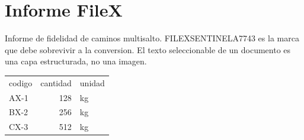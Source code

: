 \documentclass{article}
\begin{document}
\section*{Informe FileX}

Informe de fidelidad de caminos multisalto. FILEXSENTINELA7743 es la marca que
debe sobrevivir a la conversion. El texto seleccionable de un documento es una
capa estructurada, no una imagen.

\begin{tabular}{lrl}
codigo & cantidad & unidad \\
AX-1 & 128 & kg \\
BX-2 & 256 & kg \\
CX-3 & 512 & kg \\
\end{tabular}
\end{document}
